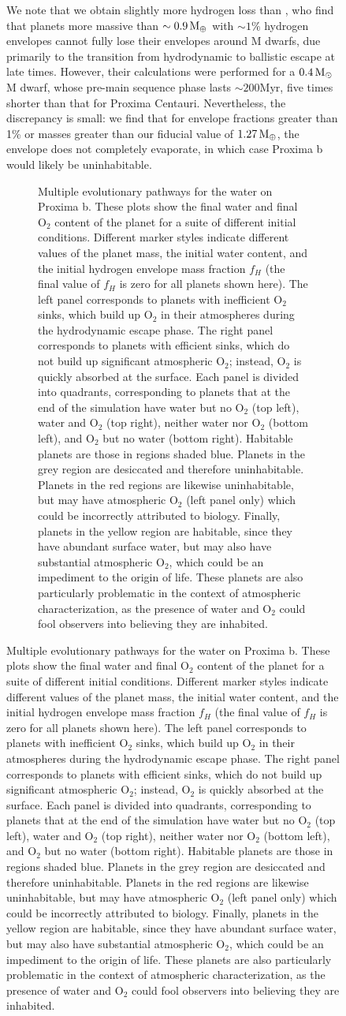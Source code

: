 \documentclass[preprint,12pt]{aastex}
\def\imagebox#1#2{\vtop to #1{\null\hbox{#2}\vfill}} %
\def\mearth{{\rm\,M_\oplus}}
\def\msun{{\rm\,M_\odot}}
\begin{document}
\begin{figure}
We note that we obtain slightly more hydrogen loss than
\cite{OwenMohanty16}, who find that planets more massive than $\sim
0.9 \mearth$ with $\sim 1\%$ hydrogen envelopes cannot fully lose
their envelopes around M dwarfs, due primarily to the transition from
hydrodynamic to ballistic escape at late times. However, their
calculations were performed for a $0.4 \msun$ M dwarf, whose pre-main
sequence phase lasts $\sim 200 \mathrm{Myr}$, five times shorter than
that for Proxima Centauri. Nevertheless, the discrepancy is small: we
find that for envelope fractions greater than 1\% or masses greater
than our fiducial value of $1.27 \mearth$, the envelope does not
completely evaporate, in which case Proxima b would likely be
uninhabitable.

\begin{figure}
\centering
\subfigure{\label{fig:atmesc:synth:a}\imagebox{2.5in}{\texttt{[image: synth\_a]}}}
\subfigure{\label{fig:atmesc:synth:b}\imagebox{2.5in}{\texttt{[image: synth\_b]}}}
\subfigure{\label{fig:atmesc:synth:c}\imagebox{2.5in}{\texttt{[image: synth\_c]}}}
\caption{Multiple evolutionary pathways for the water on Proxima
  b. These plots show the final water and final O$_2$ content of the
  planet for a suite of different initial conditions. Different marker
  styles indicate different values of the planet mass, the initial
  water content, and the initial hydrogen envelope mass fraction $f_H$
  (the final value of $f_H$ is zero for all planets shown here).  The
  left panel corresponds to planets with inefficient O$_2$ sinks,
  which build up O$_2$ in their atmospheres during the hydrodynamic
  escape phase. The right panel corresponds to planets with efficient
  sinks, which do not build up significant atmospheric O$_2$; instead,
  O$_2$ is quickly absorbed at the surface. Each panel is divided into
  quadrants, corresponding to planets that at the end of the
  simulation have water but no O$_2$ (top left), water and O$_2$ (top
  right), neither water nor O$_2$ (bottom left), and O$_2$ but no
  water (bottom right). Habitable planets are those in regions shaded
  blue. Planets in the grey region are desiccated and therefore
  uninhabitable. Planets in the red regions are likewise
  uninhabitable, but may have atmospheric O$_2$ (left panel only)
  which could be incorrectly attributed to biology. Finally, planets
  in the yellow region are habitable, since they have abundant surface
  water, but may also have substantial atmospheric O$_2$, which could
  be an impediment to the origin of life. These planets are also
  particularly problematic in the context of atmospheric
  characterization, as the presence of water and O$_2$ could fool
  observers into believing they are inhabited.}
\label{fig:atmesc:synth}
\end{figure}


\end{figure}
\end{document}

